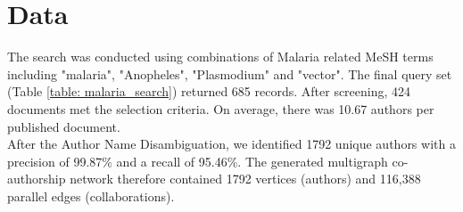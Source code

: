 \section{Data}
\label{sec:malaria_data}
The search was conducted using combinations of Malaria related MeSH terms including "malaria", "Anopheles", "Plasmodium" and "vector". %
The final query set (Table \ref{table: malaria_search}) returned 685 records. After screening, 424 documents met the selection criteria. On average, there was 10.67 authors per published document.\\
After the Author Name Disambiguation, we identified 1792 unique authors with a precision of 99.87\% and a recall of 95.46\%. The generated multigraph co-authorship network therefore contained 1792 vertices (authors) and 116,388 parallel edges (collaborations).\\

